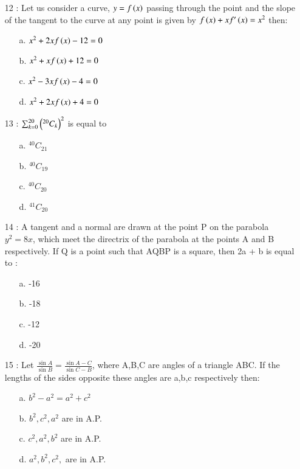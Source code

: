 \documentclass[journal]{IEEEtran}
\begin{document}
\begin{enumerate}
\item[12]: Let us consider a curve, $y = f\left(x\right)$ passing through the point  and the slope of the tangent to the curve at any point  is given by $f\left(x\right)+xf'\left(x\right)=x^2$ then:
\begin{enumerate}
     \item [a.] $x^2+2xf\left(x\right)-12=0$
    \item [b.] $x^2+xf\left(x\right)+12=0$
    \item [c.] $x^2-3xf\left(x\right)-4=0$
    \item [d.] $x^2+2xf\left(x\right)+4=0$
\end{enumerate}
\item[13]: $\sum_{k=0}^{20} \left(^{20}C_k\right)^2$ is equal to
\begin{enumerate}
     \item [a.] $^{40}C_{21}$
    \item [b.] $^{40}C_{19}$
    \item [c.] $^{40}C_{20}$
    \item [d.] $^{41}C_{20}$
\end{enumerate}
\item[14]: A tangent and a normal are drawn at the point
P on the parabola $y^2 = 8x$, which meet the
directrix of the parabola at the points A and B
respectively. If Q is a point such that AQBP
is a square, then 2a + b is equal to :
\begin{enumerate}
\item [a.] -16
    \item [b.]-18
    \item [c.] -12
    \item [d.] -20
\end{enumerate}
\item[15] : Let $\frac{\sin{A}}{\sin{B}}=\frac{\sin{A-C}}{\sin{C-B}}$, where A,B,C are angles of a triangle ABC. If the lengths of the sides opposite these angles are a,b,c respectively then:
\begin{enumerate}
\item [a.] $b^2-a^2=a^2+c^2$
    \item [b.]$b^2,c^2,a^2$ are in A.P.
    \item [c.] $c^2,a^2,b^2$ are in A.P.
    \item [d.] $a^2,b^2,c^2,$ are in A.P.
\end{enumerate}
\end{enumerate}
\end{document}
